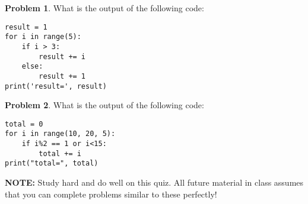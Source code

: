 \documentclass[10pt]{article}
\theoremstyle{definition}
\newtheorem{problem}{Problem}
\begin{document}
\begin{problem}
    What is the output of the following code:
\end{problem}
\begin{lstlisting}
result = 1
for i in range(5):
    if i > 3:
        result += i
    else:
        result += 1
print('result=', result)
\end{lstlisting}
\vspace{2in}


\begin{problem}
    What is the output of the following code:
\end{problem}
\begin{lstlisting}
total = 0
for i in range(10, 20, 5):
    if i%2 == 1 or i<15:
        total += i
print("total=", total)
\end{lstlisting}
\vspace{2in}

{
    \noindent
    \Large
    \textbf{NOTE:}
    Study hard and do well on this quiz.
    All future material in class assumes that you can complete problems similar to these perfectly!
}
\end{document}
